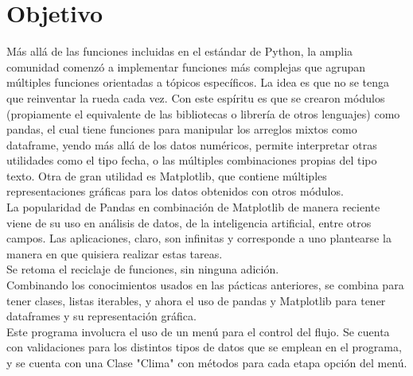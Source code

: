 \documentclass{assignment}
\begin{document}
	
	
	\section*{Objetivo}
	Más allá de las funciones incluidas en el estándar de Python, la amplia comunidad comenzó a implementar funciones más complejas que agrupan múltiples funciones orientadas a tópicos específicos. La idea es que no se tenga que reinventar la rueda cada vez. Con este espíritu es que se crearon módulos (propiamente el equivalente de las bibliotecas o librería de otros lenguajes) como pandas, el cual tiene funciones para manipular los arreglos mixtos como dataframe, yendo más allá de los datos numéricos, permite interpretar otras utilidades como el tipo fecha, o las múltiples combinaciones propias del tipo texto. Otra de gran utilidad es Matplotlib, que contiene múltiples representaciones gráficas para los datos obtenidos con otros módulos.\\
	La popularidad de Pandas en combinación de Matplotlib de manera reciente viene de su uso en análisis de datos, de la inteligencia artificial, entre otros campos. Las aplicaciones, claro, son infinitas y corresponde a uno plantearse la manera en que quisiera realizar estas tareas.\\
	Se retoma el reciclaje de funciones, sin ninguna adición.\\
	Combinando los conocimientos usados en las pácticas anteriores, se combina para tener clases, listas iterables, y ahora el uso de pandas y Matplotlib para tener dataframes y su representación gráfica.\\
	Este programa involucra el uso de un menú para el control del flujo. Se cuenta con validaciones para los distintos tipos de datos que se emplean en el programa, y se cuenta con una Clase "Clima" con métodos para cada etapa opción del menú.
\end{document}
